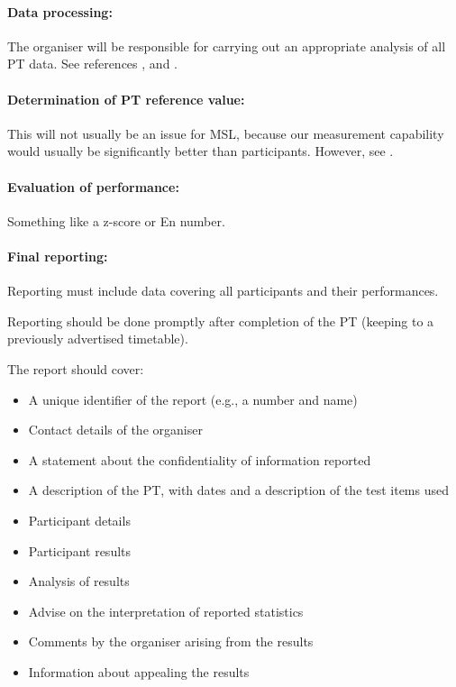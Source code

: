 \paragraph{Data processing:}
The organiser will be responsible for carrying out an appropriate analysis of all PT data. See references \cite{Milde:2020}, \cite{BSI:repeatability} and \cite{BSI:proficiency}.

\paragraph{Determination of PT reference value:}
This will not usually be an issue for MSL, because our measurement capability would usually be significantly better than participants. However, see \cite{Milde:2020}.
 
\paragraph{Evaluation of performance:}
Something like a z-score or En number.

\paragraph{Final reporting:}
Reporting must include data covering all participants and their performances. 

Reporting should be done promptly after completion of the PT (keeping to a previously advertised timetable).

The report should cover:

\begin{itemize}
	\item A unique identifier of the report (e.g., a number and name) 
	\item Contact details of the organiser
	\item A statement about the confidentiality of information reported
	\item A description of the PT, with dates and a description of the test items used
	\item Participant details
	\item Participant results
	\item Analysis of results
	\item Advise on the interpretation of reported statistics 
	\item Comments by the organiser arising from the results
	\item Information about appealing the results 
\end{itemize} 

